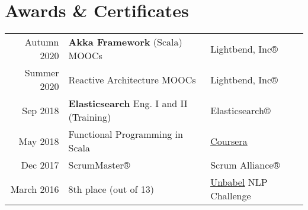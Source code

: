 \documentclass[letterpaper]{deedy-resume} %
\begin{document}
\begin{minipage}[t]{0.64\textwidth}
\vspace{\topsep}

\section{Awards \& Certificates} 
\begin{tabular}{rll}
Autumn 2020   & \textbf{Akka Framework} (Scala) MOOCs              & Lightbend, Inc® \\
Summer 2020   & Reactive Architecture MOOCs              & Lightbend, Inc® \\
Sep 2018   & \textbf{Elasticsearch} Eng. I and II (Training)              & Elasticsearch® \\
May 2018         & Functional Programming in Scala              & \href{https://www.coursera.org/account/accomplishments/verify/N4KVKVTZBQD2}{\underline{Coursera}}          \\
Dec 2017         & ScrumMaster®                                 & Scrum Alliance®   \\             
March 2016		 & 8th place (out of 13)                        & \href{https://unbabel.com/}{\underline{Unbabel}} NLP Challenge \\

\end{tabular}


\end{minipage} %




\end{document}
